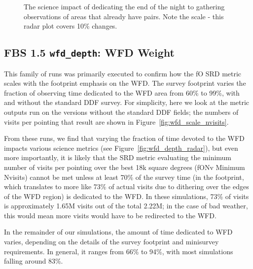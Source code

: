 \begin{figure}
\caption{The science impact of dedicating the end of the night to gathering observations of areas that already have pairs. Note the scale - this radar plot covers 10\% changes. }
\label{fig:third_radar}
\end{figure}



\subsection{FBS 1.5 {\tt wfd\_depth}: WFD Weight}\label{ss:wfd_depth}

This family of runs was primarily executed to confirm how the fO SRD metric scales with the footprint emphasis on the WFD. The survey footprint varies the fraction of observing time dedicated to the WFD area from 60\% to 99\%, with and without the standard DDF survey. For simplicity, here we look at the metric outputs run on the versions without the standard DDF fields; the numbers of visits per pointing that result are shown in Figure~\ref{fig:wfd_scale_nvisits}. 

From these runs, we find that varying the fraction of time devoted to the WFD impacts various science metrics (see Figure~\ref{fig:wfd_depth_radar}), but even more importantly, it is likely that the SRD metric evaluating the minimum number of visits per pointing over the best 18k square degrees (fONv Minimum Nvisits) cannot be met unless at least 70\% of the survey time (in the footprint, which translates to more like 73\% of actual visits due to dithering over the edges of the WFD region) is dedicated to the WFD. In these simulations, 73\% of visits is approximately 1.65M visits out of the total 2.22M; in the case of bad weather, this would mean more visits would have to be redirected to the WFD. 

In the remainder of our simulations, the amount of time dedicated to WFD varies, depending on the details of the survey footprint and minisurvey requirements. In general, it ranges from 66\% to 94\%, with most simulations falling around 83\%. 

